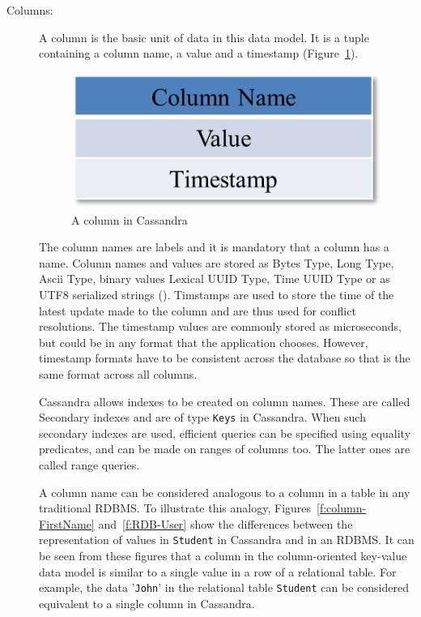 \begin{description}
\item[Columns:]  A column is the basic unit of data in this data model.  It is a
tuple containing a column name,   a value and a timestamp (Figure~\ref{f:column}). 

\begin{figure}[h]
	\centering
	\includegraphics[width=.4\textwidth]{./figure/Example/Column.png}
	\caption{A column in Cassandra}\label{f:column}
\end{figure}

The column names are labels  and it is mandatory that a column has a name. 
Column names and values are stored as Bytes Type,   Long Type, Ascii Type,  
binary values Lexical UUID Type,   Time UUID Type or as UTF8 serialized strings
().  Timstamps are used to store the time of the latest update made
to the column and are thus used for conflict resolutions.  The timestamp values
are commonly stored as microseconds,   but could be in any format that the
application chooses.  However,   timestamp formats have to be consistent across
the database so that is the same format across all columns.

Cassandra allows indexes to be created on column names.  These are called
Secondary indexes and are of type \texttt{Keys} in Cassandra.  When such
secondary indexes are used,   efficient queries can be specified using equality
predicates,   and can be made on ranges of columns too.  The latter ones are
called range queries.

A column name can be considered analogous to a column in a table in any
traditional \ac{RDBMS}.  To illustrate this analogy,
Figures~\ref{f:column-FirstName} and~\ref{f:RDB-User} show the differences
between the representation of values in \texttt{Student} in Cassandra and in an
\ac{RDBMS}.
It can be seen from these figures that a column in the column-oriented key-value
data model is similar to a single value in a row of a relational table.  For
example,   the data '\texttt{John}' in the relational table \texttt{Student} can
be considered equivalent to a single column in Cassandra.


\end{description}

